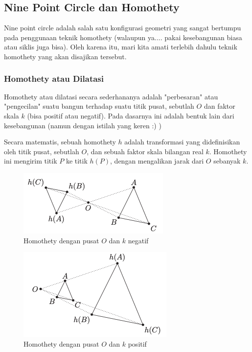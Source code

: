 \documentclass[11pt]{scrartcl}
\begin{document}
\subsection{Nine Point Circle dan Homothety}
Nine point circle adalah salah satu konfigurasi geometri yang sangat bertumpu pada penggunaan teknik homothety (walaupun ya.... pakai kesebangunan biasa atau siklis juga bisa). Oleh karena itu, mari kita amati terlebih dahulu teknik homothety yang akan disajikan tersebut.

\subsubsection{Homothety atau Dilatasi}
Homothety atau dilatasi secara sederhananya adalah "perbesaran" atau "pengecilan" suatu bangun terhadap suatu titik pusat, sebutlah $O$ dan faktor skala $k$ (bisa positif atau negatif). Pada dasarnya ini adalah bentuk lain dari kesebangunan (namun dengan istilah yang keren :) )

Secara matematis, sebuah homothety $h$ adalah transformasi yang didefinisikan oleh titik pusat, sebutlah $O$, dan sebuah faktor skala bilangan real $k$. Homothety ini mengirim titik $P$ ke titik $h(P)$, dengan mengalikan jarak dari $O$ sebanyak $k$.

    \begin{figure}[h]
        \centering
        \includegraphics[scale=0.7]{Geometri/Symmedian-NinePoint/homothety-negatif.png}
        \caption{Homothety dengan pusat $O$ dan $k$ negatif}
        \label{fig:homothety-negatif}
    \end{figure}
    \begin{figure}[h]
        \centering
        \includegraphics[scale=0.7]{Geometri/Symmedian-NinePoint/homothety-positif.png}
        \caption{Homothety dengan pusat $O$ dan $k$ positif}
        \label{fig:homothety-positif}
    \end{figure}
\end{document}
